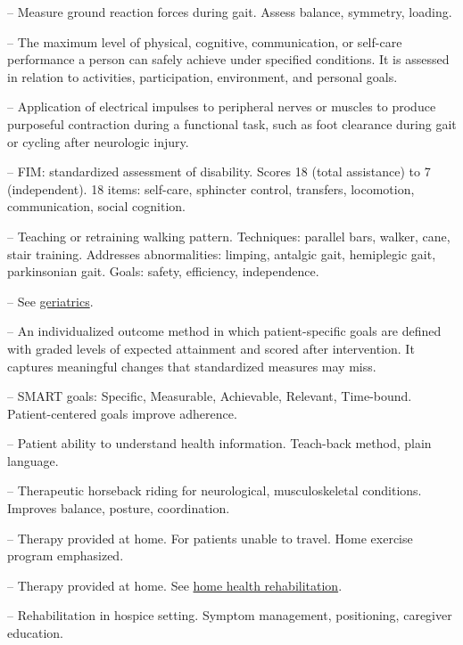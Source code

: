 -- Measure ground reaction forces during gait. Assess balance, symmetry, loading.

-- The maximum level of physical, cognitive, communication, or self-care performance a person can safely achieve under specified conditions. It is assessed in relation to activities, participation, environment, and personal goals.

-- Application of electrical impulses to peripheral nerves or muscles to produce purposeful contraction during a functional task, such as foot clearance during gait or cycling after neurologic injury.

-- FIM: standardized assessment of disability. Scores 18 (total assistance) to 7 (independent). 18 items: self-care, sphincter control, transfers, locomotion, communication, social cognition.

-- Teaching or retraining walking pattern. Techniques: parallel bars, walker, cane, stair training. Addresses abnormalities: limping, antalgic gait, hemiplegic gait, parkinsonian gait. Goals: safety, efficiency, independence.

-- See \hyperlink{Geriatrics}{geriatrics}.

-- An individualized outcome method in which patient-specific goals are defined with graded levels of expected attainment and scored after intervention. It captures meaningful changes that standardized measures may miss.

-- SMART goals: Specific, Measurable, Achievable, Relevant, Time-bound. Patient-centered goals improve adherence.


-- Patient ability to understand health information. Teach-back method, plain language.

-- Therapeutic horseback riding for neurological, musculoskeletal conditions. Improves balance, posture, coordination.

-- Therapy provided at home. For patients unable to travel. Home exercise program emphasized.

-- Therapy provided at home. See \hyperlink{Home Health Rehabilitation}{home health rehabilitation}.

-- Rehabilitation in hospice setting. Symptom management, positioning, caregiver education.


